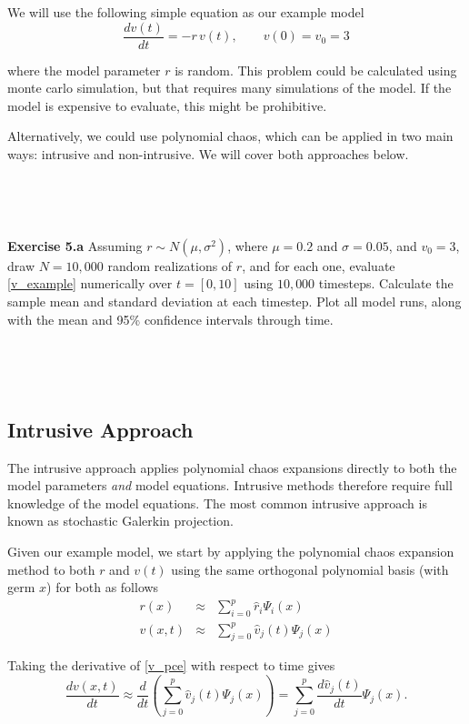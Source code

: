 \documentclass[11pt]{article}
\numberwithin{equation}{section}
\begin{document}
We will use the following simple equation as our example model
\begin{equation}
\frac{dv(t)}{dt} = - r \, v(t), \qquad v(0) = v_0 = 3 \label{v_example}
\end{equation}

where the model parameter $r$ is random. This problem could be calculated using monte carlo simulation, but that requires many simulations of the model. If the model is expensive to evaluate, this might be prohibitive.

\qquad Alternatively, we could use polynomial chaos, which can be applied in two main ways: intrusive and non-intrusive. We will cover both approaches below.

\

\

\textbf{Exercise 5.a} Assuming $r \sim N(\mu, \sigma^2)$, where $\mu = 0.2$ and $\sigma = 0.05$, and $v_0 = 3$, draw $N = 10,000$ random realizations of $r$, and for each one, evaluate \eqref{v_example} numerically over $t = [0, 10]$ using $10,000$ timesteps. Calculate the sample mean and standard deviation at each timestep. Plot all model runs, along with the mean and 95\% confidence intervals through time.

\

\



\subsection{Intrusive Approach}

The intrusive approach applies polynomial chaos expansions directly to both the model parameters {\em and} model equations. Intrusive methods therefore require full knowledge of the model equations. The most common intrusive approach is known as stochastic Galerkin projection.

\qquad Given our example model, we start by applying the polynomial chaos expansion method to both $r$ and $v(t)$ using the same orthogonal polynomial basis (with germ $x$) for both as follows
\begin{eqnarray}
r(x) & \approx & \sum_{i=0}^p \hat{r}_i \Psi_i(x) \label{r_pce} \\
v(x, t) & \approx & \sum_{j=0}^p \hat{v}_j(t) \Psi_j(x) \label{v_pce}
\end{eqnarray}

Taking the derivative of \eqref{v_pce} with respect to time gives 
\begin{equation}
\frac{dv(x, t)}{dt} \approx \frac{d}{dt} \left( \sum_{j=0}^p \hat{v}_j(t) \Psi_j(x) \right) = \sum_{j=0}^p \frac{d \hat{v}_j(t)}{dt} \Psi_j(x). \label{dv_pce}
\end{equation}
\end{document}
